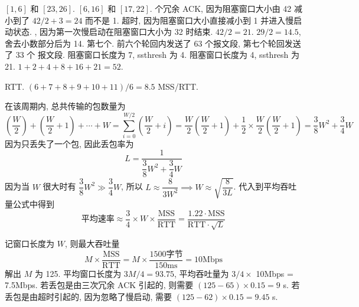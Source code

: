 \documentclass[11pt]{homework}
\begin{document}
\question
\begin{alphaparts}
    \questionpart $[1, 6]$ 和 $[23, 26]$.
    \questionpart $[6, 16]$ 和 $[17, 22]$.
     个冗余 ACK, 因为阻塞窗口大小由 42 减小到了 $42 / 2 + 3 = 24$
    而不是 1.
    \questionpart 超时, 因为阻塞窗口大小直接减小到 1 并进入慢启动状态.
    , 因为第一次慢启动在阻塞窗口大小为 32 时结束.
    \questionpart $42 / 2 = 21$.
    \questionpart $29 / 2 = 14.5$, 舍去小数部分后为 14.
    \questionpart 第七个. 前六个轮回内发送了 63 个报文段, 第七个轮回发送了 33 个
    报文段.
    \questionpart 阻塞窗口长度为 7, ssthresh 为 4.
    \questionpart 阻塞窗口长度为 4, ssthresh 为 21.
    \questionpart $1 + 2 + 4 + 8 + 16 + 21 = 52$.
\end{alphaparts}

\question
\begin{alphaparts}
     RTT\@.
    \questionpart $(6 + 7 + 8 + 9 + 10 + 11) / 6 = 8.5$ MSS/RTT\@.
\end{alphaparts}

\question
\begin{alphaparts}
    \questionpart 在该周期内, 总共传输的包数量为
    \begin{equation}
        \left( \frac{ W }{ 2 }\right) + \left( \frac{ W }{ 2 } + 1\right) +
        \cdots + W = \sum_{i = 0}^{W / 2} \left( \frac{ W }{ 2 } + i\right)
        = \frac{ W }{ 2 }\left( \frac{ W }{ 2 } + 1\right) + \frac{ 1 }{ 2 }
        \times \frac{ W }{ 2 } \left( \frac{ W }{ 2 } + 1\right) =
        \frac{ 3 }{ 8 }W^{2} + \frac{ 3 }{ 4 } W
    \end{equation}
    因为只丢失了一个包, 因此丢包率为
    \begin{equation}
        L = \frac{ 1 }{ \dfrac{ 3 }{ 8 }W^{2} + \dfrac{ 3 }{ 4 } W }
    \end{equation}
    \questionpart 因为当 $W$ 很大时有 $\dfrac{ 3 }{ 8 }W^{2} \gg
        \dfrac{ 3 }{ 4 } W$, 所以 $L \approx \dfrac{ 8 }{ 3 W^{2} } \implies
        W \approx \sqrt{ \dfrac{ 8 }{ 3L } }$. 代入到平均吞吐量公式中得到
    \begin{equation}
        \text{平均速率} \approx \frac{ 3 }{ 4 } \times W \times
        \frac{ \text{MSS} }{ \text{RTT} } =
        \frac{ 1.22 \cdot \text{MSS} }{ \text{RTT} \cdot \sqrt{L} }
    \end{equation}
\end{alphaparts}

\question
\begin{alphaparts}
    \questionpart 记窗口长度为 $W$, 则最大吞吐量
    \begin{equation}
        M \times \frac{ \text{MSS} }{ \text{RTT} } = M \times
        \frac{ 1500\text{字节} }{ 150\text{ms} } = 10\text{Mbps}
    \end{equation}
    解出 $M$ 为 125.
    \questionpart 平均窗口长度为 $3 M / 4 = 93.75$, 平均吞吐量为 $3 / 4 \times$
    10Mbps = 7.5Mbps.
    \questionpart 若丢包是由三次冗余 ACK 引起的, 则需要 $(125 - 65) \times 0.15
        = 9$ s. 若丢包是由超时引起的, 因为忽略了慢启动, 需要 $(125 - 62) \times
        0.15 = 9.45$ s.
\end{alphaparts}
\end{document}
